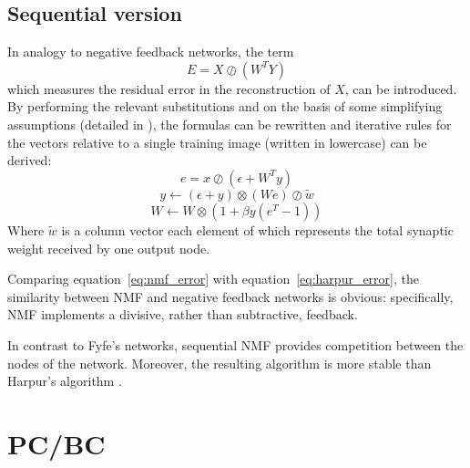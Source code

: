 \documentclass[11pt,a4paper]{report}
\begin{document}
			\subsection{Sequential version}
			In analogy to negative feedback networks, the term
			\begin{equation*}
				E = X \oslash (W^T Y)
			\end{equation*}
			which measures the residual error in the reconstruction of $X$, can be introduced. By performing the relevant substitutions and on the basis of some simplifying assumptions (detailed in \cite{spratling2009unsupervised}), the formulas can be rewritten and iterative rules for the vectors relative to a single training image (written in lowercase) can be derived:
			\begin{equation}
				\label{eq:nmf_error}
				e = x \oslash (\epsilon + W^T y)
			\end{equation}
			\begin{equation}
				y \leftarrow (\epsilon + y) \otimes (We) \oslash \tilde{w}
			\end{equation}
			\begin{equation}
				W \leftarrow W \otimes (1 + \beta y (e^T - 1))
			\end{equation}
			Where $\tilde{w}$ is a column vector each element of which represents the total synaptic weight received by one output node.
			
			Comparing equation~\ref{eq:nmf_error} with equation~\ref{eq:harpur_error}, the similarity between NMF and negative feedback networks is obvious: specifically, NMF implements a divisive, rather than subtractive, feedback.
			
			In contrast to Fyfe's networks, sequential NMF provides competition between the nodes of the network. Moreover, the resulting algorithm is more stable than Harpur's algorithm \cite{spratling2009unsupervised}.
	
		\newpage

		\section{PC/BC}
			\label{sec:pcbc}
\end{document}
